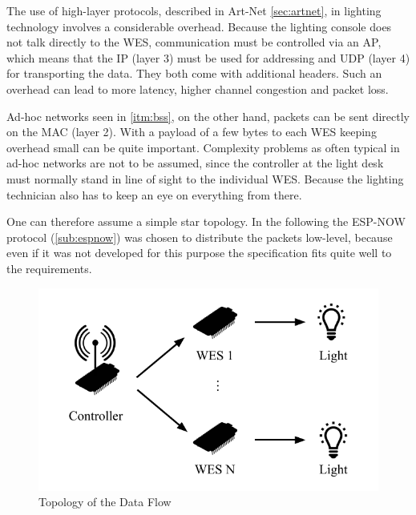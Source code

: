 The use of high-layer protocols, described in Art-Net \cref{sec:artnet}, 
in lighting technology involves a considerable overhead. 
Because the lighting console does not talk directly to the \ac{WES}, communication must be controlled via an \ac{AP}, 
which means that the \ac{IP} (layer 3) must be used for addressing and \ac{UDP} (layer 4) for transporting the data. 
They both come with additional headers. 
Such an overhead can lead to more latency, higher channel congestion and packet loss.
 
Ad-hoc networks seen in \cref{itm:bss}, on the other hand, packets can be sent directly on the MAC (layer 2).
With a payload of a few bytes to each WES keeping overhead small can be quite important. 
Complexity problems as often typical in ad-hoc networks are not to be assumed, 
since the controller at the light desk must normally stand in line of sight to the individual WES.
Because the lighting technician also has to keep an eye on everything from there.

One can therefore assume a simple star topology.
In the following the ESP-NOW protocol (\cref{sub:espnow}) was chosen to distribute the packets low-level, 
because even if it was not developed for this purpose the specification fits quite well to the requirements.

\begin{figure}[h]
	\centering
	\includegraphics[scale=0.75]{figures/dataFlow.pdf}
	\caption{Topology of the Data Flow}
	\label{fig:testbed}
\end{figure}

